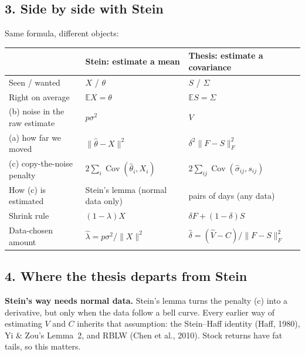 \documentclass[12pt]{article}
\begin{document}
\subsection*{3. Side by side with Stein}
Same formula, different objects:
\begin{center}
\small
\begin{tabular}{@{}lll@{}}
\toprule
 & Stein: estimate a mean & Thesis: estimate a covariance \\
\midrule
Seen / wanted & $X$ / $\theta$ & $S$ / $\Sigma$ \\
Right on average & $\mathbb{E}X=\theta$ & $\mathbb{E}S=\Sigma$ \\
(b) noise in the raw estimate & $p\sigma^2$ & $V$ \\
(a) how far we moved & $\|\hat\theta-X\|^2$ & $\delta^2\|F-S\|_F^2$ \\
(c) copy-the-noise penalty & $2\sum_i\operatorname{Cov}(\hat\theta_i,X_i)$ & $2\sum_{ij}\operatorname{Cov}(\hat\sigma_{ij},s_{ij})$ \\
How (c) is estimated & Stein's lemma (normal data only) & pairs of days (any data) \\
Shrink rule & $(1-\lambda)X$ & $\delta F+(1-\delta)S$ \\
Data-chosen amount & $\hat\lambda=p\sigma^2/\|X\|^2$ & $\hat\delta=(\hat V-\hat C)/\|F-S\|_F^2$ \\
\bottomrule
\end{tabular}
\end{center}

\subsection*{4. Where the thesis departs from Stein}
\textbf{Stein's way needs normal data.} Stein's lemma turns the penalty (c) into a derivative, but only
when the data follow a bell curve. Every earlier way of estimating $V$ and $C$ inherits that
assumption: the Stein--Haff identity (Haff, 1980), Yi \& Zou's Lemma~2, and RBLW (Chen et al., 2010).
Stock returns have fat tails, so this matters.
\end{document}
